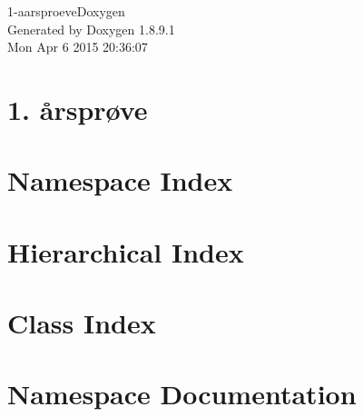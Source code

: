 \documentclass[twoside]{book}
\newcommand{\+}{\discretionary{\mbox{\scriptsize$\hookleftarrow$}}{}{}}
\newcommand{\clearemptydoublepage}{%
  \newpage{\pagestyle{empty}\cleardoublepage}%
}
\begin{document}
\hypersetup{pageanchor=false,
             bookmarks=true,
             bookmarksnumbered=true,
             pdfencoding=unicode
            }
\begin{titlepage}
\vspace*{7cm}
\begin{center}%
{\Large 1-\/aarsproeve\+Doxygen }\\
\vspace*{1cm}
{\large Generated by Doxygen 1.8.9.1}\\
\vspace*{0.5cm}
{\small Mon Apr 6 2015 20:36:07}\\
\end{center}
\end{titlepage}
\clearemptydoublepage
\tableofcontents
\clearemptydoublepage
{}
\hypersetup{pageanchor=true}

\chapter{1. årsprøve}
\label{md__c_1__users__daniel_winther__documents__git_hub_1-aarsproeve__r_e_a_d_m_e}
\hypertarget{md__c_1__users__daniel_winther__documents__git_hub_1-aarsproeve__r_e_a_d_m_e}{}

\chapter{Namespace Index}

\chapter{Hierarchical Index}

\chapter{Class Index}

\chapter{Namespace Documentation}












\end{document}
